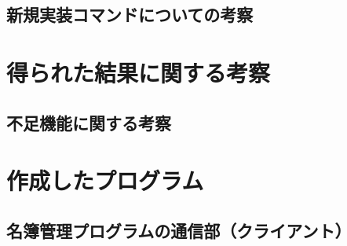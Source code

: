 \documentclass[11pt]{jsarticle}
\begin{document}
\subsection{新規実装コマンドについての考察}
\subsection{}

\section{得られた結果に関する考察}

\subsection{不足機能に関する考察}





\section{作成したプログラム}

\subsection{名簿管理プログラムの通信部（クライアント）} \label{sec:client.c}
\end{document}
